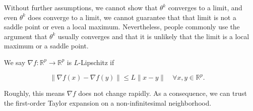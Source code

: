 Without further assumptions, we cannot show that $\theta^{k}$ converges to a limit, and even $\theta^{k}$ does converge to a limit, we cannot guarantee that that limit is not a saddle point or even a local maximum. Nevertheless, people commonly use the argument that $\theta^{k}$ usually converges and that it is unlikely that the limit is a local maximum or a saddle point.

\begin{definition}[2.3][$L$-Lipschitz]
    We say $\nabla f: \mathbb{R}^{p} \rightarrow \mathbb{R}^{p}$ is $L$-Lipschitz if

    $$
    \|\nabla f(x)-\nabla f(y)\| \leq L\|x-y\| \quad \forall x, y \in \mathbb{R}^{p} .
    $$

    Roughly, this means $\nabla f$ does not change rapidly. As a consequence, we can trust the first-order Taylor expansion on a non-infinitesimal neighborhood.
\end{definition}

